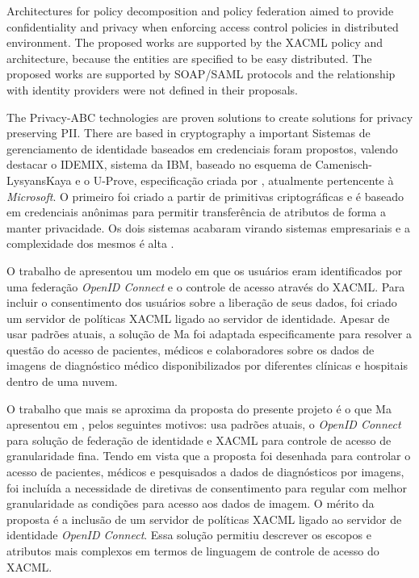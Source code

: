 \documentclass{doublecol-new}
\begin{document}
Architectures for policy decomposition \cite{lin2008policy} and policy federation \cite{decat2012toward,decat2013federated,decat2014middleware} aimed to provide confidentiality and privacy when enforcing access control policies in distributed environment. The proposed works are supported by the XACML policy and architecture, because the entities are specified to be easy distributed. The proposed works are supported by SOAP/SAML protocols and the relationship with identity providers were not defined in their proposals. 

The Privacy-ABC technologies are proven solutions to create solutions for privacy preserving PII. There are based in cryptography a important 
Sistemas de gerenciamento de identidade baseados em credenciais foram propostos, valendo destacar o IDEMIX\cite{camenisch2002design}, sistema da IBM, baseado no esquema de Camenisch-LysyansKaya \cite{camenisch2001efficient} e o U-Prove, especificação criada por \cite{brands2000rethinking}, atualmente pertencente à \textit{Microsoft}. O primeiro foi criado a partir de primitivas criptográficas e é baseado em credenciais anônimas para permitir transferência de atributos de forma a manter privacidade. Os dois sistemas acabaram virando sistemas empresariais e a complexidade dos mesmos é alta \cite{nogueira2014aprimoramento}.

O trabalho de \cite{ma2015cloud} apresentou um modelo em que os usuários eram identificados por uma federação \textit{OpenID Connect} e o controle de acesso através do XACML. Para incluir o consentimento dos usuários sobre a liberação de seus dados, foi criado um servidor de políticas XACML ligado ao servidor de identidade. Apesar de usar padrões atuais, a solução de Ma foi adaptada especificamente para resolver a questão do acesso de pacientes, médicos e colaboradores sobre os dados de imagens de diagnóstico médico disponibilizados por diferentes clínicas e hospitais dentro de uma nuvem.

O trabalho que mais se aproxima da proposta do presente projeto é o que Ma apresentou em \cite{ma2015cloud}, pelos seguintes motivos: usa padrões atuais, o \textit{OpenID Connect} para solução de federação de identidade e XACML para controle de acesso de granularidade fina. Tendo em vista que a proposta foi desenhada para controlar o acesso de pacientes, médicos e pesquisados a dados de diagnósticos por imagens, foi incluída a necessidade de diretivas de consentimento para regular com melhor granularidade as condições para acesso aos dados de imagem. O mérito da proposta é a inclusão de um servidor de políticas XACML ligado ao servidor de identidade \textit{OpenID Connect}. Essa solução permitiu descrever os escopos e atributos mais complexos em termos de linguagem de controle de acesso do XACML.
\end{document}
